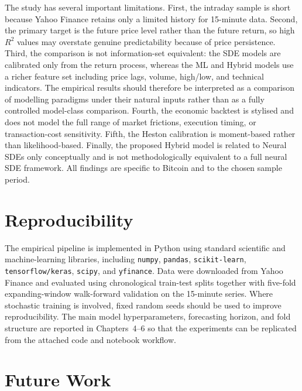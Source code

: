 \documentclass[12pt, a4paper, oneside]{report}
\theoremstyle{plain}
\theoremstyle{definition}
\theoremstyle{remark}
\begin{document}
The study has several important limitations.  First, the intraday sample is
short because Yahoo Finance retains only a limited history for 15-minute data.
Second, the primary target is the future price level rather than the future
return, so high $R^2$ values may overstate genuine predictability because of
price persistence.  Third, the comparison is not information-set equivalent:
the SDE models are calibrated only from the return process, whereas the ML and
Hybrid models use a richer feature set including price lags, volume, high/low,
and technical indicators.  The empirical results should therefore be interpreted
as a comparison of modelling paradigms under their natural inputs rather than as
a fully controlled model-class comparison.  Fourth, the economic backtest is
stylised and does not model the full range of market frictions, execution
timing, or transaction-cost sensitivity.  Fifth, the Heston calibration is
moment-based rather than likelihood-based.  Finally, the proposed Hybrid model
is related to Neural SDEs only conceptually and is not methodologically
equivalent to a full neural SDE framework.  All findings are specific to
Bitcoin and to the chosen sample period.

\section*{Reproducibility}

The empirical pipeline is implemented in Python using standard scientific and
machine-learning libraries, including \texttt{numpy}, \texttt{pandas},
\texttt{scikit-learn}, \texttt{tensorflow/keras}, \texttt{scipy}, and
\texttt{yfinance}.  Data were downloaded from Yahoo Finance and evaluated using
chronological train-test splits together with five-fold expanding-window
walk-forward validation on the 15-minute series.  Where stochastic training is
involved, fixed random seeds should be used to improve reproducibility.  The
main model hyperparameters, forecasting horizon, and fold structure are reported
in Chapters~4--6 so that the experiments can be replicated from the attached
code and notebook workflow.

\section*{Future Work}
\end{document}
